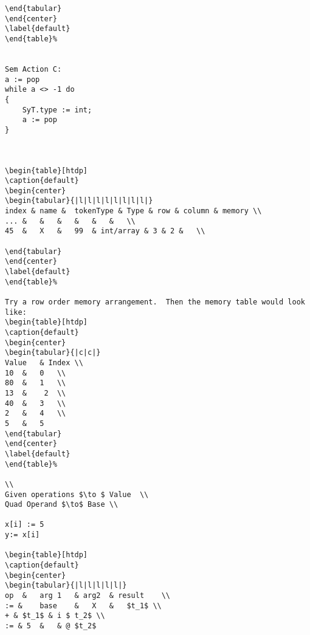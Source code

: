 \begin{lstlisting}
\end{tabular}
\end{center}
\label{default}
\end{table}%


Sem Action C:
a := pop
while a <> -1 do 
{
	SyT.type := int;
	a := pop
}



\begin{table}[htdp]
\caption{default}
\begin{center}
\begin{tabular}{|l|l|l|l|l|l|l|l|}
index &	name &	tokenType & Type & row & column & memory \\
... &	&	&	&	&	&	\\
45	&	X	&	99	& int/array	& 3	& 2	&	\\

\end{tabular}
\end{center}
\label{default}
\end{table}%

Try a row order memory arrangement.  Then the memory table would look like:
\begin{table}[htdp]
\caption{default}
\begin{center}
\begin{tabular}{|c|c|}
Value	& Index	\\
10	&	0	\\
80 	& 	1	\\
13 	&	 2	\\
40	&	3	\\
2	&	4	\\
5	&	5	
\end{tabular}
\end{center}
\label{default}
\end{table}%

\\
Given operations $\to $ Value  \\
Quad Operand $\to$ Base \\

x[i] := 5
y:= x[i]  

\begin{table}[htdp]
\caption{default}
\begin{center}
\begin{tabular}{|l|l|l|l|l|}
op	&	arg 1	& arg2	& result	\\
:= &	base	&	X	&	$t_1$ \\
+ &	$t_1$ & i $ t_2$ \\
:= & 5	&	& @ $t_2$ 


\end{lstlisting}
